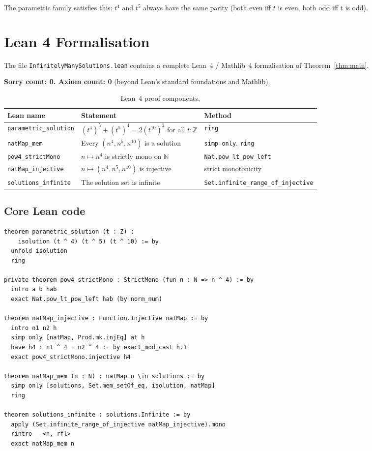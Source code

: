 \documentclass[12pt,a4paper]{article}
\theoremstyle{definition}
\newcommand{\Z}{\mathbb{Z}}
\newcommand{\N}{\mathbb{N}}
\begin{document}
The parametric family satisfies this: $t^4$ and $t^5$ always have the same
parity (both even iff $t$ is even, both odd iff $t$ is odd).

\section{Lean 4 Formalisation}\label{sec:lean}

The file \texttt{InfinitelyManySolutions.lean} contains a complete Lean~4 /
Mathlib~4 formalisation of Theorem~\ref{thm:main}.

\textbf{Sorry count: 0.  Axiom count: 0} (beyond Lean's standard foundations and
Mathlib).

\begin{table}[h]
\centering
\caption{Lean~4 proof components.}
\label{tab:lean}
\renewcommand{\arraystretch}{1.2}
\begin{tabular}{lll}
\toprule
\textbf{Lean name} & \textbf{Statement} & \textbf{Method} \\
\midrule
\texttt{parametric\_solution} & $(t^4)^5 + (t^5)^4 = 2(t^{10})^2$ for all $t : \Z$ & \texttt{ring} \\
\texttt{natMap\_mem} & Every $(n^4, n^5, n^{10})$ is a solution & \texttt{simp only}, \texttt{ring} \\
\texttt{pow4\_strictMono} & $n \mapsto n^4$ is strictly mono on $\N$ & \texttt{Nat.pow\_lt\_pow\_left} \\
\texttt{natMap\_injective} & $n \mapsto (n^4, n^5, n^{10})$ is injective & strict monotonicity \\
\texttt{solutions\_infinite} & The solution set is infinite & \texttt{Set.infinite\_range\_of\_injective} \\
\bottomrule
\end{tabular}
\end{table}

\subsection{Core Lean code}

\begin{lstlisting}[language=Lean4]
theorem parametric_solution (t : Z) :
    isolution (t ^ 4) (t ^ 5) (t ^ 10) := by
  unfold isolution
  ring

private theorem pow4_strictMono : StrictMono (fun n : N => n ^ 4) := by
  intro a b hab
  exact Nat.pow_lt_pow_left hab (by norm_num)

theorem natMap_injective : Function.Injective natMap := by
  intro n1 n2 h
  simp only [natMap, Prod.mk.injEq] at h
  have h4 : n1 ^ 4 = n2 ^ 4 := by exact_mod_cast h.1
  exact pow4_strictMono.injective h4

theorem natMap_mem (n : N) : natMap n \in solutions := by
  simp only [solutions, Set.mem_setOf_eq, isolution, natMap]
  ring

theorem solutions_infinite : solutions.Infinite := by
  apply (Set.infinite_range_of_injective natMap_injective).mono
  rintro _ <n, rfl>
  exact natMap_mem n
\end{lstlisting}
\end{document}
